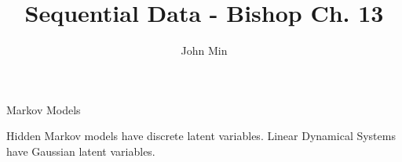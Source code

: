 \documentclass{article}
\author{John Min}
\title{Sequential Data - Bishop Ch. 13}
\begin{document}
\maketitle

Markov Models 

Hidden Markov models have discrete latent variables.
Linear Dynamical Systems have Gaussian latent variables.
\end{document}
